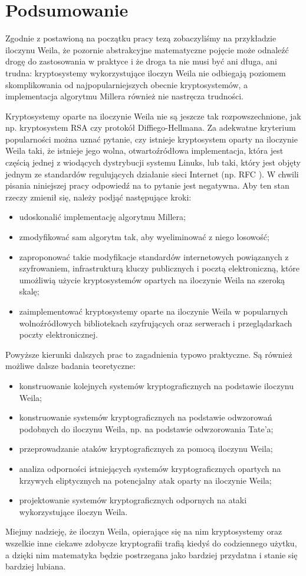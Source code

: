 \chapter*{Podsumowanie}

\noindent
Zgodnie z postawioną na początku pracy tezą
zobaczyliśmy na przykładzie iloczynu Weila,
że pozornie abstrakcyjne matematyczne pojęcie
może odnaleźć drogę do zastosowania w praktyce
i że droga ta nie musi być ani długa, ani trudna:
kryptosystemy wykorzystujące iloczyn Weila
nie odbiegają poziomem skomplikowania
od najpopularniejszych obecnie kryptosystemów,
a implementacja algorytmu Millera również nie nastręcza trudności.

\noindent
Kryptosystemy oparte na iloczynie Weila nie są jeszcze tak rozpowszechnione,
jak np. kryptosystem RSA czy protokół Diffiego-Hellmana.
Za adekwatne kryterium popularności można uznać pytanie,
czy istnieje kryptosystem oparty na iloczynie Weila taki,
że istnieje jego wolna, otwartoźródłowa implementacja,
która jest częścią jednej z wiodących dystrybucji systemu Linuks,
lub taki,
który jest objęty jednym ze standardów regulujących działanie
sieci Internet (np. RFC \cite{rfc}).
W chwili pisania niniejszej pracy odpowiedź na to pytanie jest negatywna.
Aby ten stan rzeczy zmienił się,
należy podjąć następujące kroki:
\begin{itemize}
\item
udoskonalić implementację algorytmu Millera;
\item
zmodyfikować sam algorytm tak, aby wyeliminować z niego losowość;
\item
zaproponować takie modyfikacje standardów internetowych
powiązanych z szyfrowaniem,
infrastrukturą kluczy publicznych
i pocztą elektroniczną,
które umożliwią użycie kryptosystemów opartych na iloczynie Weila
na szeroką skalę;
\item
zaimplementować kryptosystemy oparte na iloczynie Weila
w popularnych wolnoźródłowych bibliotekach szyfrujących
oraz serwerach i przeglądarkach poczty elektronicznej.
\end{itemize}

\noindent
Powyższe kierunki dalszych prac to zagadnienia typowo praktyczne.
Są również możliwe dalsze badania teoretyczne:
\begin{itemize}
\item
konstruowanie kolejnych systemów kryptograficznych
na podstawie iloczynu Weila;
\item
konstruowanie systemów kryptograficznych
na podstawie odwzorowań podobnych do iloczynu Weila,
np. na podstawie odwzorowania Tate'a;
\item
przeprowadzanie ataków kryptograficznych za pomocą iloczynu Weila;
\item
analiza odporności istniejących systemów kryptograficznych
opartych na krzywych eliptycznych
na potencjalny atak oparty na iloczynie Weila;
\item
projektowanie systemów kryptograficznych odpornych na ataki
wykorzystujące iloczyn Weila.
\end{itemize}

\noindent
Miejmy nadzieję, że iloczyn Weila,
opierające się na nim kryptosystemy
oraz wszelkie inne ciekawe zdobycze kryptografii
trafią kiedyś do codziennego użytku,
a dzięki nim matematyka będzie postrzegana jako bardziej przydatna
i stanie się bardziej lubiana.
